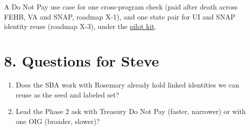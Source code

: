 \documentclass[letterpaper,11pt]{article}
\providecommand{\tightlist}{\setlength{\itemsep}{0pt}\setlength{\parskip}{0pt}}
\begin{document}
A Do Not Pay use case for one cross-program check (paid after death
across FEHB, VA and SNAP, roadmap X-1), and one state pair for UI and
SNAP identity reuse (roadmap X-3), under the
\href{../proposals/pilot_kit.pdf}{pilot kit}.

\hypertarget{questions-for-steve}{%
\section*{8. Questions for Steve}\label{questions-for-steve}}

\begin{enumerate}
\def\labelenumi{\arabic{enumi}.}
\tightlist
\item
  Does the SBA work with Rosemary already hold linked identities we can
  reuse as the seed and labeled set?
\item
  Lead the Phase 2 ask with Treasury Do Not Pay (faster, narrower) or
  with one OIG (broader, slower)?
\end{enumerate}
\end{document}
